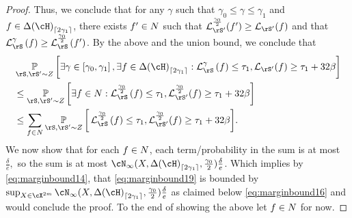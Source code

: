 \begin{proof}
   Thus, we conclude that for any $ \gamma $ such that $
   \gamma_{0}\leq \gamma\leq\gamma_{1} $ and $
   f\in\dlh_{\left\lceil2\gamma_{1}\right\rceil} $, there exists $
   f'\in N$ such that   $\ls_{\rS'}^{\frac{\gamma_{0}}{2}}(f')\geq \ls_{\rS'}(f)$ and that $ \ls_{\rS}^{\gamma}\left(f\right)\geq \ls_{\rS}^{\frac{\gamma_{0}}{2}}\left(f'\right) $.  
   By the above and the union bound, we conclude that
   \begin{align}\nonumber
    &\p_{\rS,\rS'\sim Z}\bigg[\exists \gamma \in \left[\gamma_{0},\gamma_{1}\right],\exists f\in \dlh_{\left\lceil2\gamma_{1}\right\rceil} :  \ls_{\rS}^{\gamma}\left(f\right)
    \leq \tau_{1}, \ls_{\rS'}(f) \geq 
    \tau_{1} 
        + 32\beta\bigg]
    \\
    &\leq
    \p_{\rS,\rS'\sim Z}\bigg[\exists f\in N :  \ls_{\rS}^{\frac{\gamma_{0}}{2}}\left(f\right)
    \leq \tau_{1}, \ls_{\rS'}^{\frac{\gamma_{0}}{2}}(f) \geq 
    \tau_{1} 
        + 32\beta\bigg]\nonumber
    \\
    &\leq
    \sum_{f\in \Net}
    \p_{\rS,\rS'\sim Z}\bigg[  \ls_{\rS}^{\frac{\gamma_{0}}{2}}\left(f\right)
    \leq \tau_{1}, \ls_{\rS'}^{\frac{\gamma_{0}}{2}}(f) \geq 
    \tau_{1} 
        + 32\beta\bigg]. \label{eq:marginbound13}
   \end{align}
   We now show that for each $ f\in N $, each term/probability in the sum is at most $ \frac{\delta}{e}, $ so the sum is at most $ \cN_{\infty}(X,\dlh_{\left\lceil2\gamma_{1}\right\rceil},\frac{\gamma_{0}}{2}) \frac{\delta}{e} $. Which implies by \cref{eq:marginbound14}, that \cref{eq:marginbound19} is bounded by $\sup_{X\in \cX^{2m}}   \cN_{\infty}(X,\dlh_{\left\lceil2\gamma_{1}\right\rceil},\frac{\gamma_{0}}{2}) \frac{\delta}{e} $ as claimed below \cref{eq:marginbound16} and would conclude the proof. To the end of showing the above let  $ f\in N $ for now.


\end{proof}

